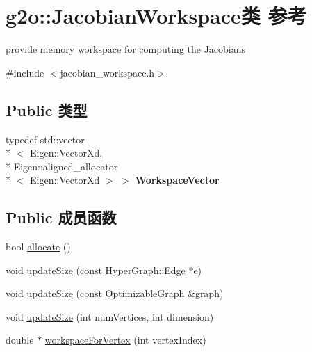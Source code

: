 \hypertarget{classg2o_1_1JacobianWorkspace}{\section{g2o\-:\-:Jacobian\-Workspace类 参考}
\label{classg2o_1_1JacobianWorkspace}
}


provide memory workspace for computing the Jacobians  




{\ttfamily \#include $<$jacobian\-\_\-workspace.\-h$>$}

\subsection*{Public 类型}
\begin{DoxyCompactItemize}
\item 
\hypertarget{classg2o_1_1JacobianWorkspace_aee9d767fa1208772a3de83732646e182}{typedef std\-::vector\\*
$<$ Eigen\-::\-Vector\-Xd, \\*
Eigen\-::aligned\-\_\-allocator\\*
$<$ Eigen\-::\-Vector\-Xd $>$ $>$ {\bfseries Workspace\-Vector}}\label{classg2o_1_1JacobianWorkspace_aee9d767fa1208772a3de83732646e182}

\end{DoxyCompactItemize}
\subsection*{Public 成员函数}
\begin{DoxyCompactItemize}
\item 
bool \hyperlink{classg2o_1_1JacobianWorkspace_a8e1d23ced91b721fdb5bd68c8c4e9fc3}{allocate} ()
\item 
void \hyperlink{classg2o_1_1JacobianWorkspace_a2d16ad6db1a51aa93c806cc9c06e223f}{update\-Size} (const \hyperlink{classg2o_1_1HyperGraph_1_1Edge}{Hyper\-Graph\-::\-Edge} $\ast$e)
\item 
void \hyperlink{classg2o_1_1JacobianWorkspace_ae3d715bd25e196d8db81661ef0fbd09b}{update\-Size} (const \hyperlink{structg2o_1_1OptimizableGraph}{Optimizable\-Graph} \&graph)
\item 
void \hyperlink{classg2o_1_1JacobianWorkspace_aa15a007fee3037116ea0e857855080d2}{update\-Size} (int num\-Vertices, int dimension)
\item 
double $\ast$ \hyperlink{classg2o_1_1JacobianWorkspace_ad68c37d7779d3a034bc1b864cd98690b}{workspace\-For\-Vertex} (int vertex\-Index)
\end{DoxyCompactItemize}

